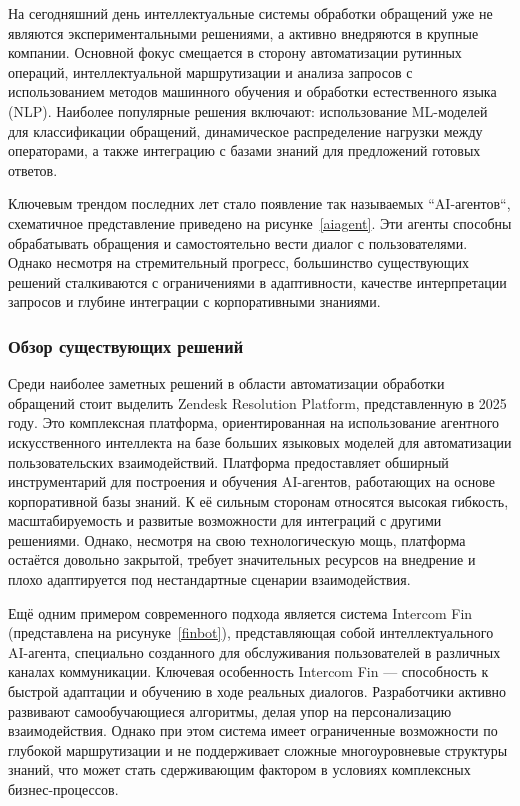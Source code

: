 На сегодняшний день интеллектуальные системы обработки обращений уже не являются экспериментальными решениями, а активно внедряются в крупные компании. Основной фокус смещается в сторону автоматизации рутинных операций, интеллектуальной маршрутизации и анализа запросов с использованием методов машинного обучения и обработки естественного языка (NLP). Наиболее популярные решения включают: использование ML-моделей для классификации обращений, динамическое распределение нагрузки между операторами, а также интеграцию с базами знаний для предложений готовых ответов.


Ключевым трендом последних лет стало появление так называемых ``AI-агентов``, схематичное представление приведено на рисунке~\ref{aiagent}. Эти агенты способны обрабатывать обращения и самостоятельно вести диалог с пользователями. Однако несмотря на стремительный прогресс, большинство существующих решений сталкиваются с ограничениями в адаптивности, качестве интерпретации запросов и глубине интеграции с корпоративными знаниями.


\subsubsection{Обзор существующих решений}

Среди наиболее заметных решений в области автоматизации обработки обращений стоит выделить Zendesk Resolution Platform\cite{Zendesk}, представленную в 2025 году. Это комплексная платформа, ориентированная на использование агентного искусственного интеллекта на базе больших языковых моделей для автоматизации пользовательских взаимодействий. Платформа предоставляет обширный инструментарий для построения и обучения AI-агентов, работающих на основе корпоративной базы знаний. К её сильным сторонам относятся высокая гибкость, масштабируемость и развитые возможности для интеграций с другими решениями. Однако, несмотря на свою технологическую мощь, платформа остаётся довольно закрытой, требует значительных ресурсов на внедрение и плохо адаптируется под нестандартные сценарии взаимодействия.


Ещё одним примером современного подхода является система Intercom Fin (представлена на рисунуке~\ref{finbot}), представляющая собой интеллектуального AI-агента, специально созданного для обслуживания пользователей в различных каналах коммуникации. Ключевая особенность Intercom Fin — способность к быстрой адаптации и обучению в ходе реальных диалогов. Разработчики активно развивают самообучающиеся алгоритмы, делая упор на персонализацию взаимодействия. Однако при этом система имеет ограниченные возможности по глубокой маршрутизации и не поддерживает сложные многоуровневые структуры знаний, что может стать сдерживающим фактором в условиях комплексных бизнес-процессов.

